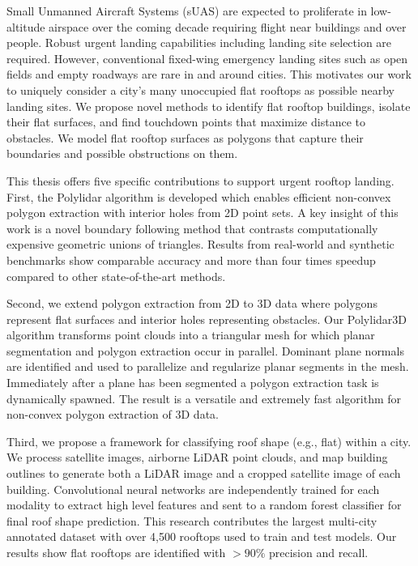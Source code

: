 Small Unmanned Aircraft Systems (sUAS) are expected to proliferate in low-altitude airspace over the coming decade requiring flight near buildings and over people.
Robust urgent landing capabilities including landing site selection are required.
However, conventional fixed-wing emergency landing sites such as open fields and empty roadways are rare in and around cities. This motivates our work to uniquely consider a city's many unoccupied flat rooftops as possible nearby landing sites. We propose novel methods to identify flat rooftop buildings, isolate their flat surfaces, and find touchdown points that maximize distance to obstacles. We model flat rooftop surfaces as polygons that capture their boundaries and possible obstructions on them.

This thesis offers five specific contributions to support urgent rooftop landing. First, the Polylidar algorithm is developed which enables efficient non-convex polygon extraction with interior holes from 2D point sets.  A key insight of this work is a novel boundary following method that contrasts computationally expensive geometric unions of triangles. Results from real-world and synthetic benchmarks show comparable accuracy and more than four times speedup compared to other state-of-the-art methods. 

Second, we extend polygon extraction from 2D to 3D data where polygons represent flat surfaces and interior holes representing obstacles. Our Polylidar3D algorithm transforms point clouds into a triangular mesh for which planar segmentation and polygon extraction occur in parallel. Dominant plane normals are identified and used to parallelize and regularize planar segments in the mesh. Immediately after a plane has been segmented a polygon extraction task is dynamically spawned. The result is a versatile and extremely fast algorithm for non-convex polygon extraction of 3D data.

Third, we propose a framework for classifying roof shape (e.g., flat) within a city. We process satellite images, airborne LiDAR point clouds, and map building outlines to generate both a LiDAR image and a cropped satellite image of each building. Convolutional neural networks are independently trained for each modality to extract high level features and sent to a random forest classifier for final roof shape prediction. This research contributes the largest multi-city annotated dataset with over 4,500 rooftops used to train and test models. Our results show flat rooftops are identified with $> 90\%$ precision and recall. 


